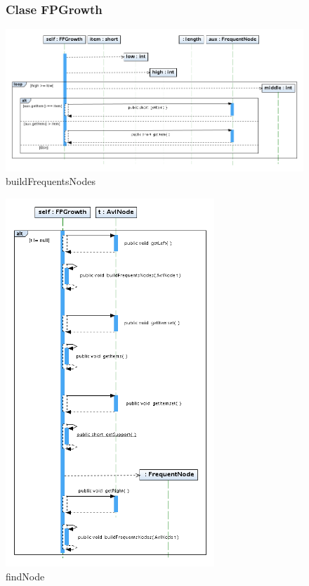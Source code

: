 % 
% 

\begin{figure}
\subsubsection{Clase FPGrowth}
\centering
\includegraphics[width=1.2\textwidth]{imgsSecuencia/FPGrowth/findNode.png}
\caption{buildFrequentsNodes}
\end{figure}
\newpage
\begin{figure}
\centering
\includegraphics[width=0.7\textwidth]{imgsSecuencia/FPGrowth/buildFrequentsNodes.png}
\caption{findNode}
\end{figure}

